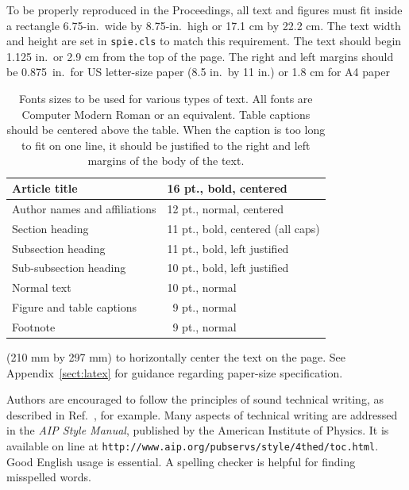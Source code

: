 \documentclass[]{spie}  %
\begin{document}
To be properly reproduced in the Proceedings, all text and figures must fit inside a rectangle 6.75-in.\ wide by 8.75-in.\ high or 17.1 cm by 22.2 cm.  The text width and height are set in {\tt spie.cls} to match this requirement. The text should begin 1.125 in.\ or 2.9 cm from the top of the page.  The right and left margins should be 0.875~in.\ for US letter-size paper (8.5 in.\ by 11 in.) or 1.8 cm for A4 paper 
\begin{table}[h]
\caption{Fonts sizes to be used for various types of text.  All fonts are Computer Modern Roman or an equivalent.  Table captions should be centered above the table.  When the caption is too long to fit on one line, it should be justified to the right and left margins of the body of the text.} 
\label{tab:fonts}
\begin{center}       
\begin{tabular}{|l|l|} %
\hline
\rule[-1ex]{0pt}{3.5ex}  Article title & 16 pt., bold, centered  \\
\hline
\rule[-1ex]{0pt}{3.5ex}  Author names and affiliations & 12 pt., normal, centered   \\
\hline
\rule[-1ex]{0pt}{3.5ex}  Section heading & 11 pt., bold, centered (all caps)  \\
\hline
\rule[-1ex]{0pt}{3.5ex}  Subsection heading & 11 pt., bold, left justified  \\
\hline
\rule[-1ex]{0pt}{3.5ex}  Sub-subsection heading & 10 pt., bold, left justified  \\
\hline
\rule[-1ex]{0pt}{3.5ex}  Normal text & 10 pt., normal  \\
\hline
\rule[-1ex]{0pt}{3.5ex}  Figure and table captions & \, 9 pt., normal \\
\hline
\rule[-1ex]{0pt}{3.5ex}  Footnote & \, 9 pt., normal \\
\hline 
\end{tabular}
\end{center}
\end{table} 
 (210 mm by 297 mm) to horizontally center the text on the page.  See Appendix~\ref{sect:latex} for guidance regarding paper-size specification. 

Authors are encouraged to follow the principles of sound technical writing, as described in Ref.~, for example.  Many aspects of technical writing are addressed in the {\em AIP Style Manual}, published by the American Institute of Physics.  It is available on line at {\tt http://www.aip.org/pubservs/style/4thed/toc.html}.  Good English usage is essential.  A spelling checker is helpful for finding misspelled words. 
\end{document}
